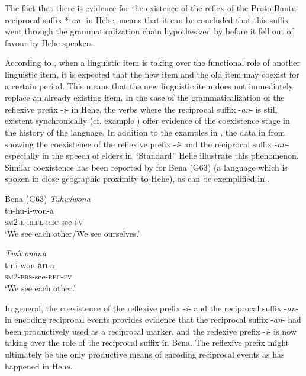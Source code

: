 \documentclass[output=paper,
            colorlinks, citecolor=brown
            ,draftmode
		  ]{langscibook}
\begin{document}
The fact that there is evidence for the existence of the reflex of the Proto-Bantu reciprocal suffix *\nobreakdash-\textit{an}{}- in Hehe, means that it can be concluded that this suffix went through the grammaticalization chain hypothesized by \citet{Schladt1998} before it fell out of favour by Hehe speakers.

According to \citet[22--23]{Hopper1991}, when a linguistic item is taking over the functional role of another linguistic item, it is expected that the new item and the old item may coexist for a certain period. This means that the new linguistic item does not immediately replace an already existing item. In the case of the grammaticalization of the reflexive prefix -\textit{i}{}- in Hehe, the verbs where the reciprocal suffix -\textit{an}{}- is still existent synchronically (cf. example ) offer evidence of the coexistence stage in the history of the language. In addition to the examples in , the data in  from \citet[59]{Msamba2013} showing the coexistence of the reflexive prefix -\textit{i}{}- and the reciprocal suffix -\textit{an}{}- especially in the speech of elders in ``Standard'' Hehe illustrate this phenomenon. Similar coexistence has been reported by \citet[249]{Morrison2011} for Bena (G63) (a language which is spoken in close geographic proximity to Hehe), as can be exemplified in .

\ea\label{ex:ngwasi:22}
Bena (G63) \citep[249]{Morrison2011}
    \ea\label{ex:ngwasi:22a} \textit{Tuhwíwona}\\
    \gll tu-hu-\textbf{i}{}-won-a\\
    \textsc{sm2-e-refl-rec}-see-\textsc{fv}\\
    \glt ‘We see each other/We see ourselves.’

    \ex\label{ex:ngwasi:22b} \textit{Twíwonana}\\
    \gll tu-i-won-\textbf{an}{}-a\\
    \textsc{sm2-prs}-see-\textsc{rec-fv}\\
    \glt ‘We see each other.’ 
    \z
\z

In general, the coexistence of the reflexive prefix -\textit{i}{}- and the reciprocal suffix -\textit{an}{}- in encoding reciprocal events provides evidence that the reciprocal suffix -\textit{an}{}- had been productively used as a reciprocal marker, and the reflexive prefix -\textit{i}{}- is now taking over the role of the reciprocal suffix in Bena. The reflexive prefix might ultimately be the only productive means of encoding reciprocal events as has happened in Hehe.
\end{document}
